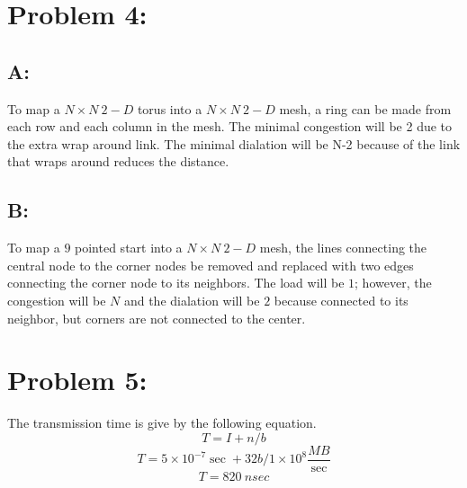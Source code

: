 \documentclass{article}
\begin{document}
\section*{Problem 4:}
\subsection*{A:}
To map a $N\times N\ 2-D$ torus into a $N\times N\ 2-D$ mesh, a ring
can be made from each row and each column in the mesh.  The minimal
congestion will be 2 due to the extra wrap around link.  The minimal
dialation will be N-2 because of the link that wraps around reduces
the distance.
\subsection*{B:}
To map a $9$ pointed start into a $N\times N\ 2-D$ mesh, the lines
connecting the central node to the corner nodes be removed and 
replaced with two edges connecting the corner node to its 
neighbors.  The load will be $1$; however, the congestion will be
$N$ and the dialation will be $2$ because
connected to its neighbor, but corners are not connected to 
the center.
\section*{Problem 5:}
The transmission time is give by the following equation.
\[
T = I + n/b
\]
\[
T = 5 \times 10^{-7} \sec + 32 b/ 1 \times10^8 \frac{MB}{\sec}
\]
\[
T = 820\ nsec
\]
\end{document}
